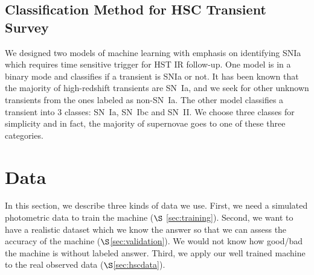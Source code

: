 \documentclass[useamsfonts]{pasj01}
\begin{document}
\subsection{Classification Method for HSC Transient Survey}
We designed two models of machine learning with emphasis on identifying SNIa which requires time sensitive trigger for HST IR follow-up.  One model is in a binary mode and classifies if a transient is SNIa or not.
It has been known that the majority of high-redshift transients are SN~Ia, and we seek for other unknown transients
from the ones labeled as non-SN~Ia.   
The other model classifies a transient into 3 classes: SN~Ia, SN~Ibc and SN~II.  
We choose three classes for simplicity and in fact, the majority of supernovae goes to one of these three categories.
%
%
%
%
%
%
\section{Data}
In this section, we describe three kinds of data we use.
First, we need a simulated photometric data to train the machine ($\S$ \ref{sec:training}).
Second, we want to have a realistic dataset which we know the answer so that we can assess the
accuracy of the machine ($\S$\ref{sec:validation}).  We would not know how good/bad the machine 
is without labeled answer.
Third, we apply our well trained machine to the real observed data ($\S$\ref{sec:hscdata}).

\end{document}
